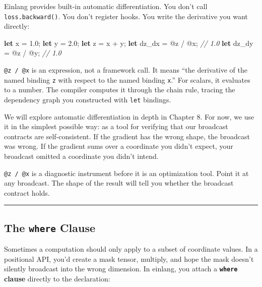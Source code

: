 \documentclass[11pt,]{article}
\newenvironment{Shaded}{}{}
\newcommand{\CommentTok}[1]{\textcolor[rgb]{0.38,0.63,0.69}{\textit{#1}}}
\newcommand{\DecValTok}[1]{\textcolor[rgb]{0.25,0.63,0.44}{#1}}
\newcommand{\KeywordTok}[1]{\textcolor[rgb]{0.00,0.44,0.13}{\textbf{#1}}}
\newcommand{\NormalTok}[1]{#1}
\begin{document}
Einlang provides built-in automatic differentiation. You don't call
\texttt{loss.backward()}. You don't register hooks. You write the
derivative you want directly:

\begin{Shaded}
\begin{Highlighting}[]
\KeywordTok{let}\NormalTok{ x = }\DecValTok{1.0}\NormalTok{;}
\KeywordTok{let}\NormalTok{ y = }\DecValTok{2.0}\NormalTok{;}
\KeywordTok{let}\NormalTok{ z = x + y;}
\KeywordTok{let}\NormalTok{ dz_dx = @z / @x;   }\CommentTok{// 1.0}
\KeywordTok{let}\NormalTok{ dz_dy = @z / @y;   }\CommentTok{// 1.0}
\end{Highlighting}
\end{Shaded}

\texttt{@z\ /\ @x} is an expression, not a framework call. It means
``the derivative of the named binding \texttt{z} with respect to the
named binding \texttt{x}.'' For scalars, it evaluates to a number. The
compiler computes it through the chain rule, tracing the dependency
graph you constructed with \texttt{let} bindings.

We will explore automatic differentiation in depth in Chapter 8. For
now, we use it in the simplest possible way: as a tool for verifying
that our broadcast contracts are self-consistent. If the gradient has
the wrong shape, the broadcast was wrong. If the gradient sums over a
coordinate you didn't expect, your broadcast omitted a coordinate you
didn't intend.

\texttt{@z\ /\ @x} is a diagnostic instrument before it is an
optimization tool. Point it at any broadcast. The shape of the result
will tell you whether the broadcast contract holds.

\begin{center}\rule{0.5\linewidth}{0.4pt}\end{center}

\hypertarget{the-where-clause}{%
\subsection{\texorpdfstring{The \texttt{where}
Clause}{The where Clause}}\label{the-where-clause}}

Sometimes a computation should only apply to a subset of coordinate
values. In a positional API, you'd create a mask tensor, multiply, and
hope the mask doesn't silently broadcast into the wrong dimension. In
einlang, you attach a \textbf{\texttt{where} clause} directly to the
declaration:
\end{document}
